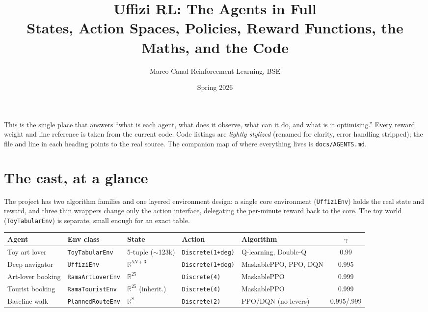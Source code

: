 \documentclass[11pt]{article}
\title{\textbf{Uffizi RL: The Agents in Full}\\[2pt]
\large States, Action Spaces, Policies, Reward Functions, the Maths, and the Code}
\author{Marco Canal \quad\textbar\quad Reinforcement Learning, BSE}
\date{Spring 2026}
\newcommand{\file}[1]{\texttt{\small #1}}
\newcommand{\co}[1]{\texttt{\small #1}}
\newcommand{\R}{\mathbb{R}}
\begin{document}
\maketitle

\noindent
This is the single place that answers ``what is each agent, what does it observe,
what can it do, and what is it optimising.'' Every reward weight and line reference
is taken from the current code. Code listings are \emph{lightly stylized} (renamed for
clarity, error handling stripped); the file and line in each heading points to the real
source. The companion map of where everything lives is \file{docs/AGENTS.md}.

\vspace{2pt}
\section{The cast, at a glance}

The project has two algorithm families and one layered environment design: a single
core environment (\file{UffiziEnv}) holds the real state and reward, and three thin
wrappers change only the action interface, delegating the per-minute reward back to the
core. The toy world (\file{ToyTabularEnv}) is separate, small enough for an exact table.

\begin{center}
\renewcommand{\arraystretch}{1.2}
\setlength{\tabcolsep}{3.8pt}
\scriptsize
\begin{tabular}{@{}l l l l l c@{}}
\toprule
\textbf{Agent} & \textbf{Env class} & \textbf{State} & \textbf{Action} & \textbf{Algorithm} & $\gamma$ \\
\midrule
Toy art lover     & \file{ToyTabularEnv}  & 5-tuple ($\sim$123k) & \co{Discrete(1+deg)} & Q-learning, Double-Q & 0.99 \\
Deep navigator    & \file{UffiziEnv}      & $\R^{5N+3}$          & \co{Discrete(1+deg)} & MaskablePPO, PPO, DQN & 0.995 \\
Art-lover booking & \file{RamaArtLoverEnv}& $\R^{25}$            & \co{Discrete(4)}     & MaskablePPO & 0.999 \\
Tourist booking   & \file{RamaTouristEnv} & $\R^{25}$ (inherit.) & \co{Discrete(4)}     & MaskablePPO & 0.999 \\
Baseline walk     & \file{PlannedRouteEnv}& $\R^{8}$             & \co{Discrete(2)}     & PPO/DQN (no levers) & 0.995/.999 \\
\bottomrule
\end{tabular}
\end{center}
\end{document}
